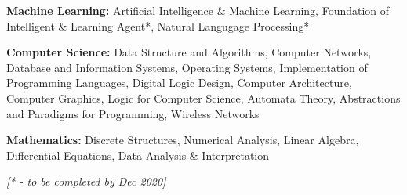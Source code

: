 \begin{cventries}
  \cventry
    {}
    {}
    {}
    {}
    {
    \vspace*{-0.4cm}
      \begin{cvitems}
        \item {\textbf{Machine Learning: }\hspace{0.9mm}Artificial Intelligence \& Machine Learning, Foundation of Intelligent \& Learning Agent*, \hspace*{3.2cm}Natural Langugage Processing*}
        \vspace{0.5mm}
        \item {\textbf{Computer Science: }\hspace{0.7mm}Data Structure and Algorithms, Computer Networks, Database and Information Systems, \hspace*{3.2cm}Operating Systems, Implementation of Programming Languages, Digital Logic Design, \hspace*{3.2cm}Computer Architecture, Computer Graphics, Logic for Computer Science, Automata Theory, \hspace*{3.2cm}Abstractions and Paradigms for Programming, Wireless Networks }
        \vspace{0.5mm}
        \item{\textbf{Mathematics: }\hspace{8.5mm}Discrete Structures, Numerical Analysis, Linear Algebra, Differential Equations, \hspace*{3.2cm}Data Analysis \& Interpretation\newline}
      \end{cvitems} 
    }
    
\end{cventries}
\vspace*{-0.8cm}
\hfill \fontsize{9pt}{1em} {\slshape\color{black}[* - to be completed by Dec 2020]}

\vspace{-0.8mm}
